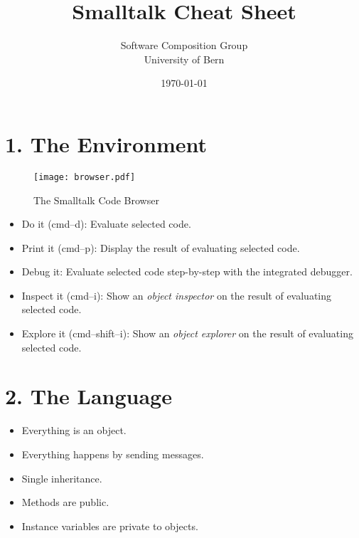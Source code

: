 \documentclass[8pt,a4paper]{leaflet}
\begin{document}
\title{\huge{\textbf{Smalltalk Cheat Sheet}}}
\author{Software Composition Group\\
University of Bern}
\date{\today}
\maketitle
\thispagestyle{empty}

\section{1. The Environment}

\begin{figure}[h!]
	\centering
	\texttt{[image: browser.pdf]}
	\caption{The Smalltalk Code Browser}
\end{figure}

\begin{itemize}
	\item Do it ({\sc cmd--d}): 
	Evaluate selected code.
	\item Print it ({\sc cmd--p}):
	Display the result of evaluating selected code.
	\item Debug it: Evaluate selected code step-by-step with the integrated debugger.
	\item Inspect it ({\sc cmd--i}):
	Show an \emph{object inspector} on the result of evaluating selected code.
	\item Explore it ({\sc cmd--shift--i}):
	Show an \emph{object explorer} on the result of evaluating selected code.
\end{itemize}

\newpage

\section{2. The Language}

\begin{itemize}
	\item Everything is an object.
	\item Everything happens by sending messages.
	\item Single inheritance.
	\item Methods are public.
	\item Instance variables are private to objects.
\end{itemize}
\end{document}

